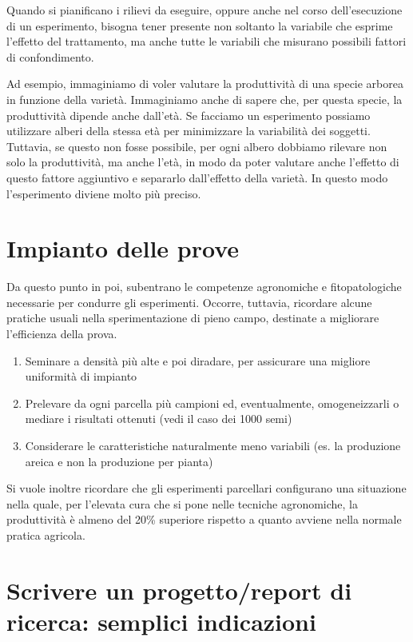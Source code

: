 \documentclass[a4paper,12pt,oneside]{book}
\providecommand{\tightlist}{%
  \setlength{\itemsep}{0pt}\setlength{\parskip}{0pt}}
\begin{document}
Quando si pianificano i rilievi da eseguire, oppure anche nel corso dell'esecuzione di un esperimento, bisogna tener presente non soltanto la variabile che esprime l'effetto del trattamento, ma anche tutte le variabili che misurano possibili fattori di confondimento.

Ad esempio, immaginiamo di voler valutare la produttività di una specie arborea in funzione della varietà. Immaginiamo anche di sapere che, per questa specie, la produttività dipende anche dall'età. Se facciamo un esperimento possiamo utilizzare alberi della stessa età per minimizzare la variabilità dei soggetti. Tuttavia, se questo non fosse possibile, per ogni albero dobbiamo rilevare non solo la produttività, ma anche l'età, in modo da poter valutare anche l'effetto di questo fattore aggiuntivo e separarlo dall'effetto della varietà. In questo modo l'esperimento diviene molto più preciso.

\hypertarget{impianto-delle-prove}{%
\section{Impianto delle prove}\label{impianto-delle-prove}}

Da questo punto in poi, subentrano le competenze agronomiche e fitopatologiche necessarie per condurre gli esperimenti. Occorre, tuttavia, ricordare alcune pratiche usuali nella sperimentazione di pieno campo, destinate a migliorare l'efficienza della prova.

\begin{enumerate}
\def\labelenumi{\arabic{enumi}.}
\tightlist
\item
  Seminare a densità più alte e poi diradare, per assicurare una migliore uniformità di impianto
\item
  Prelevare da ogni parcella più campioni ed, eventualmente, omogeneizzarli o mediare i risultati ottenuti (vedi il caso dei 1000 semi)
\item
  Considerare le caratteristiche naturalmente meno variabili (es. la produzione areica e non la produzione per pianta)
\end{enumerate}

Si vuole inoltre ricordare che gli esperimenti parcellari configurano una situazione nella quale, per l'elevata cura che si pone nelle tecniche agronomiche, la produttività è almeno del 20\% superiore rispetto a quanto avviene nella normale pratica agricola.

\hypertarget{scrivere-un-progettoreport-di-ricerca-semplici-indicazioni}{%
\section{Scrivere un progetto/report di ricerca: semplici indicazioni}\label{scrivere-un-progettoreport-di-ricerca-semplici-indicazioni}}
\end{document}
